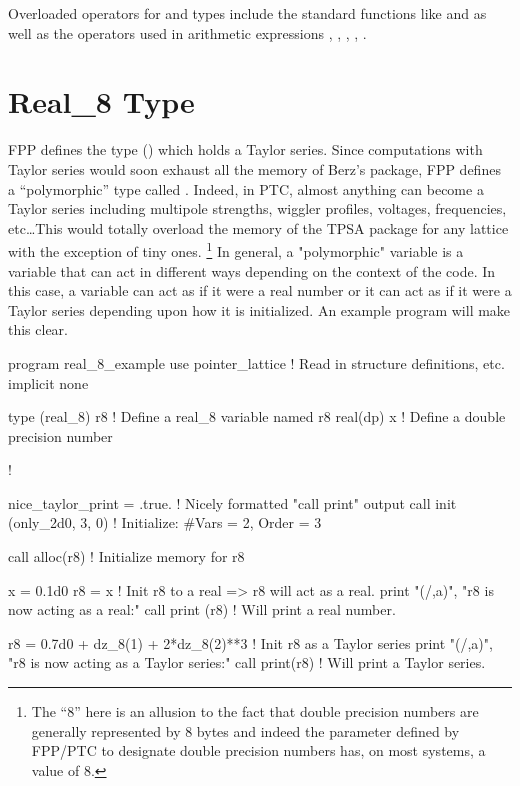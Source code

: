 \documentclass{hitec}     %
\newcommand{\Section}[1]{\section{#1}\vspace*{-1ex}}
\begin{document}
{Overloaded operators for  and  types include the standard functions
like  and  as well as the operators used in arithmetic expressions \vn{+}, \vn{-},
\vn{*}, \vn{/}, \vn{**}.

\newpage

\Section{Real_8 Type}
\label{s:real.8}

FPP defines the  type () which holds a Taylor series. Since computations
with Taylor {\color{h} series would soon exhaust all the memory of Berz's package, FPP defines a ``polymorphic'' type called . Indeed, in PTC, almost anything can become a Taylor series including multipole strengths, wiggler profiles, voltages, frequencies, etc\ldots This would totally overload the memory of the TPSA package for any lattice with the exception of tiny ones.} \footnote
  {
The ``8'' here is an allusion to the fact that double precision numbers are generally represented
by 8 bytes and indeed the  parameter defined by FPP/PTC to designate double precision numbers
has, on most systems, a value of 8.
  }
In general, a "polymorphic" variable is a variable that can act in different ways depending on the
context of the code. In this case, a  variable can act as if it were a real number or it
can act as if it were a Taylor series depending upon how it is initialized. 
An example program will make this clear.
\begin{code}
program real_8_example
use pointer_lattice   ! Read in structure definitions, etc.
implicit none

type (real_8) r8      ! Define a real_8 variable named r8
real(dp) x            ! Define a double precision number

!

nice_taylor_print = .true.    ! Nicely formatted "call print" output
call init (only_2d0, 3, 0)    ! Initialize: #Vars = 2, Order = 3

call alloc(r8)          ! Initialize memory for r8

x = 0.1d0
r8 = x                  ! Init r8 to a real => r8 will act as a real.
print "(/,a)", "r8 is now acting as a real:"
call print (r8)         ! Will print a real number.

r8 = 0.7d0 + dz_8(1) + 2*dz_8(2)**3   ! Init r8 as a Taylor series
print "(/,a)", "r8 is now acting as a Taylor series:"
call print(r8)                        ! Will print a Taylor series.


\end{code}}
\end{document}
